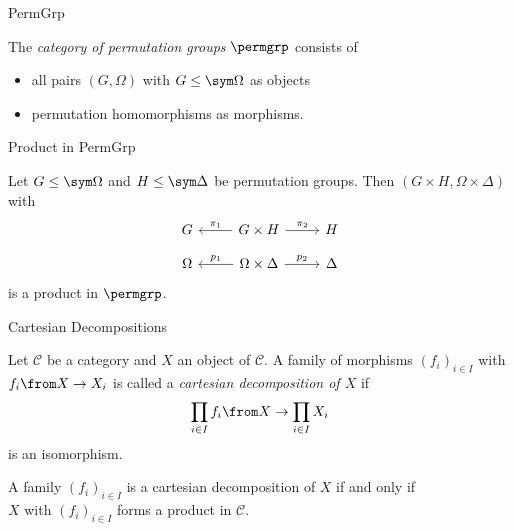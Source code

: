 \begin{frame}{PermGrp}
    \begin{defn}
        The \emph{category of permutation groups}
        $\permgrp$
        consists of
        \pause
        \vspace{-0.5em}
        \begin{itemize}
            \item
            all pairs $(G, \Omega)$ with $G \leq \sym \Omega$ as objects
            \pause
            \item
            permutation homomorphisms as morphisms.
        \end{itemize}
    \end{defn}
\end{frame}


\begin{frame}{Product in PermGrp}
    \begin{lemma}
        Let $G \leq \sym \Omega$ and $H \leq \sym \Delta$ be permutation
        groups.
        Then $(G \times H, \Omega \times \Delta)$ with
        \pause
        \[
        \begin{tikzcd}[ampersand replacement=\&, row sep=small]
            G
            \&
            G \times H
                \ar{l}[above]{\pi_1}
                \ar[r, "\pi_2"]
            \&
            H
            \\
            \Omega
            \&
            \Omega \times \Delta
                \ar{l}[above]{p_1}
                \ar[r, "p_2"]
            \&
            \Delta
        \end{tikzcd}
        \]
        is a product in $\permgrp$.
    \end{lemma}
\end{frame}

\begin{frame}{Cartesian Decompositions}
    \begin{defn}
        Let $\mathcal C$ be a category and $X$ an object of $\mathcal C$.
        A family of morphisms $(f_i)_{i \in I}$ with
        $f_i \from X \to X_i$
        is called a
        \emph{cartesian decomposition of $X$}
        if
        \pause
        \[
            \prod_{i \in I} f_i
            \from
            X
            \to
            \prod_{i \in I} X_i
        \]
        is an isomorphism.
    \end{defn}
    \pause

    \begin{lemma}
        A family $(f_i)_{i \in I}$ is a cartesian decomposition of $X$
        if and only if
        \\
        $X$ with $(f_i)_{i \in I}$ forms a product in $\mathcal C$.
    \end{lemma}
\end{frame}

